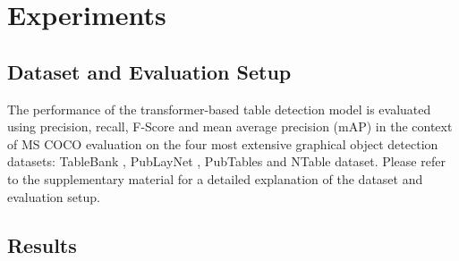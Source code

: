 \documentclass[sn-mathphys]{sn-jnl}\jyear{2021}\theoremstyle{thmstyleone}\newtheorem{theorem}{Theorem}\newtheorem{proposition}[theorem]{Proposition}\theoremstyle{thmstyletwo}\newtheorem{example}{Example}\newtheorem{remark}{Remark}\theoremstyle{thmstylethree}\newtheorem{definition}{Definition}\usepackage{amsmath}
\begin{document}
\section{Experiments }
\label{sec:experiments_results}
\subsection{Dataset and Evaluation Setup}
The performance of the transformer-based table detection model is evaluated using precision, recall, F-Score and mean average precision (mAP) in the context of MS COCO \cite{coco14} evaluation on the four most extensive graphical object detection datasets: TableBank \cite{tablebank8}, PubLayNet \cite{PubLayNet3}, PubTables \cite{pubtables5} and NTable \cite{NTables} dataset. Please refer to the supplementary material for a detailed explanation of the dataset and evaluation setup.

\subsection{Results}   
\end{document}
